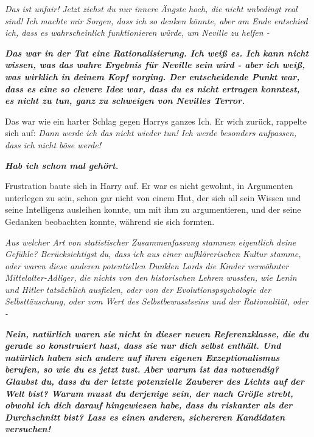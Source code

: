 \emph{Das ist unfair! }\emph{Jetzt ziehst du nur innere Ängste hoch, die nicht
unbedingt real sind! Ich machte mir Sorgen, dass ich so denken könnte, aber am
Ende entschied ich, dass es wahrscheinlich funktionieren würde, um Neville zu
helfen -}

\textbf{\emph{\glqq Das war in der Tat eine Rationalisierung. Ich weiß es. Ich
kann nicht wissen, was das wahre Ergebnis für Neville sein wird - aber ich weiß,
was wirklich in deinem Kopf vorging. Der entscheidende Punkt war, dass es eine
so clevere Idee war, dass du es nicht ertragen konntest, es nicht zu tun, ganz
zu schweigen von Nevilles Terror.\grqq{}}}

Das war wie ein harter Schlag gegen Harrys ganzes Ich. Er wich zurück, rappelte
sich auf: \emph{Dann werde ich das nicht wieder tun! Ich werde besonders
aufpassen, dass ich nicht böse werde!}

\textbf{\emph{\glqq Hab ich schon mal gehört.\grqq{}}}

Frustration baute sich in Harry auf. Er war es nicht gewohnt, in Argumenten
unterlegen zu sein, schon gar nicht von einem Hut, der sich all sein Wissen und
seine Intelligenz ausleihen konnte, um mit ihm zu argumentieren, und der seine
Gedanken beobachten konnte, während sie sich formten.

\emph{Aus welcher Art von statistischer Zusammenfassung stammen eigentlich deine
\glqq Gefühle\grqq{}? Berücksichtigst du, dass ich aus einer aufklärerischen
Kultur stamme, oder waren diese anderen potentiellen Dunklen Lords die Kinder
verwöhnter Mittelalter-Adliger, die nichts von den historischen Lehren wussten,
wie Lenin und Hitler tatsächlich ausfielen, oder von der Evolutionspsychologie
der Selbsttäuschung, oder vom Wert des Selbstbewusstseins und der Rationalität,
oder -}

\textbf{\emph{\glqq Nein, natürlich waren sie nicht in dieser neuen
Referenzklasse, die du gerade so konstruiert hast, dass sie nur dich selbst
enthält. Und natürlich haben sich andere auf ihren eigenen Exzeptionalismus
berufen, so wie du es jetzt tust.}} \textbf{\emph{Aber warum ist das notwendig?
Glaubst du, dass du der letzte potenzielle Zauberer des Lichts auf der Welt
bist? Warum musst du derjenige sein, der nach Größe strebt, obwohl ich dich
darauf hingewiesen habe, dass du riskanter als der Durchschnitt bist? Lass es
einen anderen, sichereren Kandidaten versuchen!\grqq{}}}

